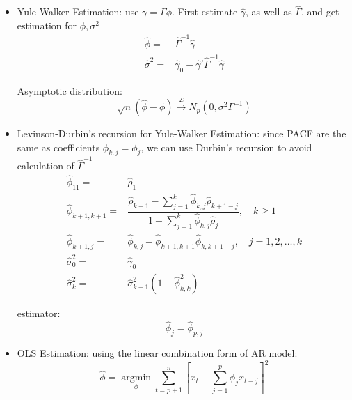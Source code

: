     \begin{itemize}[topsep=2pt,itemsep=0pt]
        \item Yule-Walker Estimation: use $ \gamma =\Gamma \phi  $. First estimate $ \hat{\gamma } $, as well as $ \hat{\Gamma } $, and get estimation for $ \phi ,\sigma ^2 $
        \begin{align*}
            \hat{\phi }=& \hat{\Gamma }^{-1}\hat{\gamma }\\
            \hat{\sigma }^2=&\hat{\gamma }_0-\hat{\gamma }'\hat{\Gamma }^{-1}\hat{\gamma }
        \end{align*}

        Asymptotic distribution:
        \begin{equation}
            \sqrt{n}(\hat{\phi }-\phi )\xrightarrow[]{\mathscr{L}} N_p(0,\sigma ^2\Gamma ^{-1}) 
        \end{equation}
        

        \item Levinson-Durbin's recursion for Yule-Walker Estimation: since PACF are the same as coefficients $ \phi _{k,j}=\phi _j $, we can use Durbin's recursion to avoid calculation of $ \hat{\Gamma }^{-1} $
        \begin{align}\label{EqaLevinsonDurbinInARp}
            \hat{\phi} _{11}=&\hat{\rho} _1\\
            \hat{\phi} _{k+1,k+1}=&\dfrac{\hat{\rho} _{k+1}-\sum_{j=1}^k\hat{\phi} _{k,j}\hat{\rho} _{k+1-j}}{1-\sum_{j=1}^k\hat{\phi} _{k,j}\hat{\rho} _j},\quad k\geq 1\\
            \hat{\phi} _{k+1,j}=&\hat{\phi} _{k,j}-\hat{\phi} _{k+1,k+1}\hat{\phi} _{k,k+1-j},\quad j=1,2,\ldots,k\\
            \hat{\sigma} _0^2=&\hat{\gamma }_0\\
            \hat{\sigma}_k^2 =& \hat{\sigma}_{k-1}^2 (1 - \hat{\phi}_{k,k}^2)
        \end{align}

        estimator:
        \begin{equation}
            \hat{\phi }_j=\hat{\phi }_{p,j} 
        \end{equation}
        
        



        \item OLS Estimation: using the linear combination form of AR model:
        \begin{equation}
            \hat{\phi }=\mathop{\arg\min}\limits_{\phi } \sum_{t=p+1}^n \left[ x_t-\sum_{j=1}^p \phi _jx_{t-j} \right]^2
        \end{equation}
        

\end{itemize}
